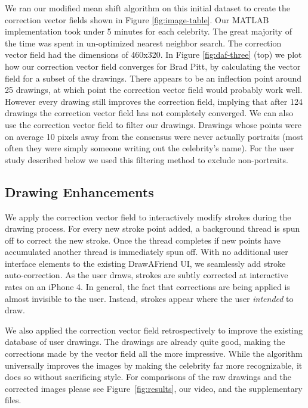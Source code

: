 We ran our modified mean shift algorithm on this initial dataset to create the correction vector fields shown in Figure \ref{fig:image-table}. Our MATLAB implementation took under 5 minutes for each celebrity.  The great majority of the time was spent in un-optimized nearest neighbor search. The correction vector field had the dimensions of 460x320. In Figure \ref{fig:daf-three} (top) we plot how our correction vector field converges for Brad Pitt, by calculating the vector field for a subset of the drawings. There appears to be an inflection point around 25 drawings, at which point the correction vector field would probably work well. However every drawing still improves the correction field, implying that after 124 drawings the correction vector field has not completely converged. We can also use the correction vector field to filter our drawings. Drawings whose points were on average 10 pixels away from the consensus were never actually portraits (most often they were simply someone writing out the celebrity's name). For the user study described below we used this filtering method to exclude non-portraits. 


\subsection {Drawing Enhancements}

We apply the correction vector field to interactively modify strokes during the drawing process. For every new stroke point added, a background thread is spun off to correct the new stroke. Once the thread completes if new points have accumulated another thread is immediately spun off. With no additional user interface elements to the existing DrawAFriend UI, we seamlessly add stroke auto-correction. As the user draws, strokes are subtly corrected at interactive rates on an iPhone 4. In general, the fact that corrections are being applied is almost invisible to the user. Instead, strokes appear where the user {\em intended} to draw.


We also applied the correction vector field retrospectively to improve the existing database of user drawings. The drawings are already quite good, making the corrections made by the vector field all the more impressive.  While the algorithm universally improves the images by making the celebrity far more recognizable, it does so without sacrificing style. For comparisons of the raw drawings and the corrected images please see Figure~\ref{fig:results}, our video, and the supplementary files.

